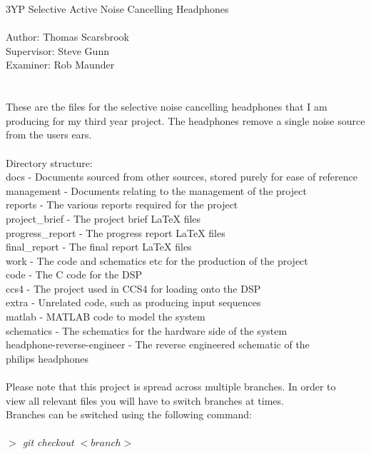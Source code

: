 3YP Selective Active Noise Cancelling Headphones
\\
\\
Author:		Thomas Scarsbrook\\
Supervisor:	Steve Gunn\\
Examiner:	Rob Maunder\\
\\
\\
These are the files for the selective noise cancelling headphones that I am
producing for my third year project. The headphones remove a single noise
source from the users ears.
\\
\\
Directory structure:\\
docs - Documents sourced from other sources, stored purely for ease of reference\\
management - Documents relating to the management of the project\\
reports - The various reports required for the project\\
\indent	project\_brief - The project brief LaTeX files\\
\indent	progress\_report - The progress report LaTeX files\\
\indent	final\_report - The final report LaTeX files\\
work - The code and schematics etc for the production of the project\\
\indent	code - The C code for the DSP\\
\indent	ccs4 - The project used in CCS4 for loading onto the DSP\\
\indent	extra - Unrelated code, such as producing input sequences\\
\indent	matlab - MATLAB code to model the system\\
\indent	schematics - The schematics for the hardware side of the system\\
\indent	headphone-reverse-engineer - The reverse engineered schematic of the\\
\indent	\indent			     philips headphones
\\
\\
Please note that this project is spread across multiple branches. In order to\\
view all relevant files you will have to switch branches at times.\\
Branches can be switched using the following command:
\\
\\
\emph{$>$ git checkout $<branch>$}
